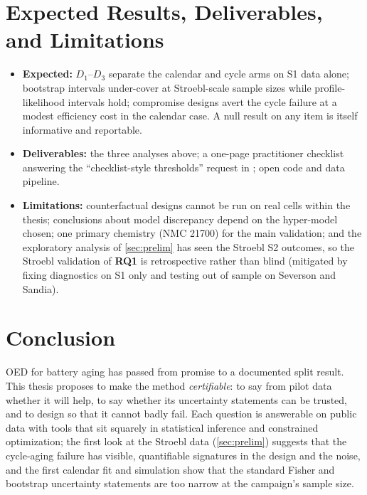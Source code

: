 \documentclass[11pt,letterpaper]{article}
\newcommand{\RQ}[1]{\textbf{RQ#1}}
\begin{document}
\section{Expected Results, Deliverables, and Limitations}\label{sec:expected}
\begin{itemize}
  \item \textbf{Expected:} $D_1$--$D_3$ separate the calendar and cycle arms on S1 data alone; bootstrap intervals under-cover at Stroebl-scale sample sizes while profile-likelihood intervals hold; compromise designs avert the cycle failure at a modest efficiency cost in the calendar case. A null result on any item is itself informative and reportable.
  \item \textbf{Deliverables:} the three analyses above; a one-page practitioner checklist answering the ``checklist-style thresholds'' request in \cite{stroebl2026}; open code and data pipeline.
  \item \textbf{Limitations:} counterfactual designs cannot be run on real cells within the thesis; conclusions about model discrepancy depend on the hyper-model chosen; one primary chemistry (NMC 21700) for the main validation; and the exploratory analysis of \cref{sec:prelim} has seen the Stroebl S2 outcomes, so the Stroebl validation of \RQ1 is retrospective rather than blind (mitigated by fixing diagnostics on S1 only and testing out of sample on Severson and Sandia).
\end{itemize}

\section{Conclusion}
OED for battery aging has passed from promise to a documented split result. This thesis proposes to make the method \emph{certifiable}: to say from pilot data whether it will help, to say whether its uncertainty statements can be trusted, and to design so that it cannot badly fail. Each question is answerable on public data with tools that sit squarely in statistical inference and constrained optimization; the first look at the Stroebl data (\cref{sec:prelim}) suggests that the cycle-aging failure has visible, quantifiable signatures in the design and the noise, and the first calendar fit and simulation show that the standard Fisher and bootstrap uncertainty statements are too narrow at the campaign's sample size.
\end{document}
